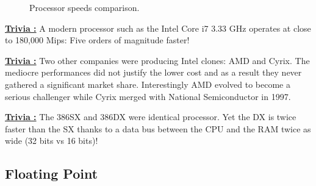 \documentclass[book.tex]{subfiles}
\begin{document}
\begin{figure}[H]
\centering
   \caption{Processor speeds comparison.} \label{fig:mips}
 \end{figure}

 \textbf{\underline{Trivia :}} A modern processor such as the Intel Core i7 3.33 GHz operates at close to 180,000 Mips: Five orders of magnitude faster!

 \bigskip

\textbf{\underline{Trivia :}}  Two other companies were producing Intel clones: AMD and Cyrix. The mediocre performances did not justify the lower cost and as a result they never gathered a significant market share. Interestingly AMD evolved to become a serious challenger while Cyrix merged with National Semiconductor in 1997.

 \bigskip
 
 \textbf{\underline{Trivia :}} The 386SX and 386DX were identical processor. Yet the DX is twice faster than the SX thanks to a data bus between the CPU and the RAM twice as wide (32 bits vs 16 bits)!












  \subsection{Floating Point}
  
\end{document}
